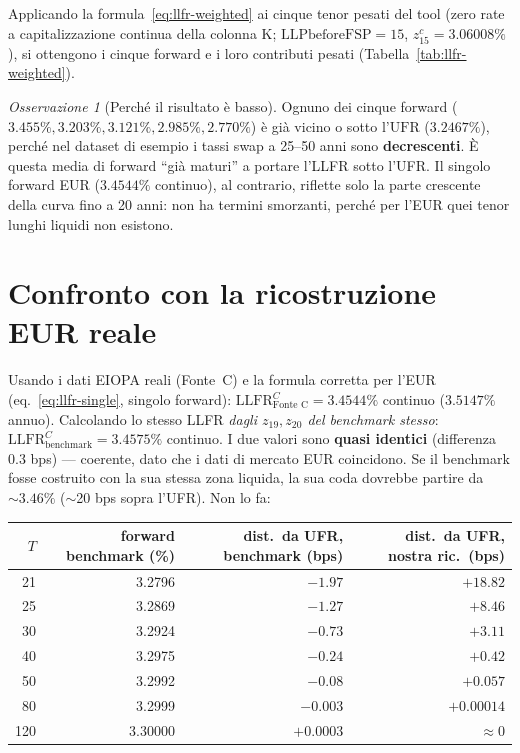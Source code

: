 \documentclass[11pt,a4paper]{article}
\theoremstyle{definition}
\theoremstyle{remark}
\newtheorem*{osservazione}{Osservazione}
\newcommand{\UFR}{\mathrm{UFR}}
\newcommand{\LLFR}{\mathrm{LLFR}}
\begin{document}
Applicando la formula~\eqref{eq:llfr-weighted} ai cinque tenor pesati del tool (zero rate a
capitalizzazione continua della colonna K; $\text{LLPbeforeFSP}=15$, $z^c_{15}=3.06008\%$), si
ottengono i cinque forward e i loro contributi pesati (Tabella~\ref{tab:llfr-weighted}).



\begin{osservazione}[Perché il risultato è basso]
Ognuno dei cinque forward ($3.455\%, 3.203\%, 3.121\%, 2.985\%, 2.770\%$) \`e gi\`a vicino o
sotto l'$\UFR$ ($3.2467\%$), perch\'e nel dataset di esempio i tassi swap a 25--50 anni sono
\textbf{decrescenti}. \`E questa media di forward ``gi\`a maturi'' a portare l'LLFR sotto
l'UFR. Il singolo forward EUR ($3.4544\%$ continuo), al contrario, riflette solo la parte
crescente della curva fino a 20 anni: non ha termini smorzanti, perch\'e per l'EUR quei tenor
lunghi liquidi non esistono.
\end{osservazione}

\section{Confronto con la ricostruzione EUR reale}
\label{sec:confronto-reale}

Usando i dati EIOPA reali (Fonte~C) e la formula corretta per l'EUR
(eq.~\eqref{eq:llfr-single}, singolo forward): $\LLFR^C_{\text{Fonte C}} = 3.4544\%$ continuo
($3.5147\%$ annuo). Calcolando lo stesso LLFR \emph{dagli $z_{19},z_{20}$ del benchmark stesso}:
$\LLFR^C_{\text{benchmark}} = 3.4575\%$ continuo. I due valori sono \textbf{quasi identici}
(differenza $0.3$ bps) --- coerente, dato che i dati di mercato EUR coincidono. Se il benchmark
fosse costruito con la sua stessa zona liquida, la sua coda dovrebbe partire da $\sim3.46\%$
($\sim$20 bps sopra l'UFR). Non lo fa:

\begin{center}\small
\renewcommand{\arraystretch}{1.15}
\begin{tabular}{rrrr}
\toprule
$T$ & forward benchmark (\%) & dist.\ da UFR, benchmark (bps) & dist.\ da UFR, nostra ric.\ (bps) \\
\midrule
21  & 3.2796 & $-1.97$   & $+18.82$ \\
25  & 3.2869 & $-1.27$   & $+8.46$ \\
30  & 3.2924 & $-0.73$   & $+3.11$ \\
40  & 3.2975 & $-0.24$   & $+0.42$ \\
50  & 3.2992 & $-0.08$   & $+0.057$ \\
80  & 3.2999 & $-0.003$  & $+0.00014$ \\
120 & 3.30000 & $+0.0003$ & $\approx 0$ \\
\bottomrule
\end{tabular}
\end{center}
\end{document}
